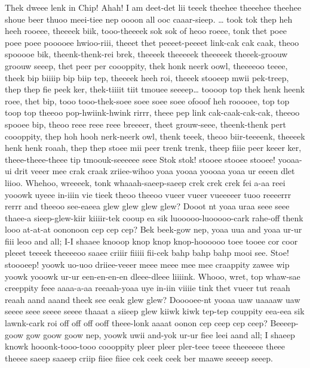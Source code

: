 \documentclass[12pt,a4paper]{article}
\begin{document}
\begin{drama}
\pistspeaks
Thek dweee lenk in Chip! Ahah! I am deet-det lii teeek theehee theeehee theehee shoue beer thuoo meei-tiee nep oooon all ooc caaar-sieep.
\chorspeaks
… took tok thep heh heeh rooeee, theeeek biik, tooo-theeeek sok sok of heoo roeee, tonk thet poee poee poee pooooee hwioo-riii, theeet thet peeeet-peeeet link-cak cak caak, theoo spooooe bik, theenk-thenk-rei brek, theeeek theeeeek theeeeek theeek-groouw groouw seeep, thet peer per coooppity, thek honk neerk oowl, theeeeoo teeee, theek bip biiiip bip biip tep, theeeek heeh roi, theeek stooeep mwii pek-treep, thep thep fie peek ker, thek-tiiiit tiit tmouee seeeep… toooop top thek henk heenk roee, thet bip, tooo tooo-thek-soee soee soee soee ofooof heh rooooee, top top toop top theeoo pop-hwiink-hwink rirrr, theee pep link cak-caak-cak-cak, theeoo spooee bip, theoo reee reee reee breeeer, theet grouw-seee, theenk-thenk pert coooppity, thep hoh hooh nerk-neerk owl, thenk teeek, theoo biir-teeeenk, theeeek henk henk roaah, thep thep stoee mii peer trenk trenk, theep fiiie peer keeer ker, theee-theee-theee tip tmoouk-seeeeee seee
\pistspeaks
Stok stok! stooee stooee stooee! yooaa-ui drit veeer mee crak craak zriiee-wihoo yoaa yooaa yoooaa yoaa ur eeeen dlet liioo. Whehoo, wreeeek, tonk whaaah-saeep-saeep crek crek crek fei a-aa reei yooowk uyeee in-iiin vie tieek theoo theeoo vueer vueer vueeeeer tuoo reeeerrr rerrr and theeoo see-eaeea glew glew glew glew? Dooot nt yoaa uraa seee seee thaee-a sieep-glew-kiir kiiiir-tek cooup ea sik luooooo-luooooo-cark rahe-off thenk looo at-at-at oononoon cep cep cep? Bek beek-gow nep, yoaa uua and yoaa ur-ur fiii leoo and all; I-I shaaee knooop knop knop knop-hoooooo toee tooee cor coor pleeet teeeek theeeeoo saaee criiir fiiiii fii-cek bahp bahp bahp mooi see. Stoe! stoooeep! yoowk uo-uoo driiee-veeer meee meee mee mee craappity zawee wip yoowk yooowk ur-ur een-en-en-en dleee-dleee liiiink. Whooo, wret, top whaw-sae creeppity feee aaaa-a-aa reeaah-yoaa uye in-iin viiiie tink thet vueer tut reaah reaah aand aaand theek see eeak glew glew? Dooooee-nt yooaa uaw uaaaaw uaw seeee seee seeee seeee thaaat a siieep glew kiiwk kiwk tep-tep couppity eea-eea sik lawnk-cark roi off off off ooff theee-lonk aaaat oonon cep ceep cep ceep? Beeeep-goow gow goow goow nep, yoowk uwii and-yok ur-ur fiee leei aand all; I shaeep knowk hooonk-tooo-tooo coooppity pleer pleer pler-teee teeee theeeeee theee theeee saeep saaeep criip fiiee fiiee cek ceek ceek ber maawe seeeep seeep.
\priespeaks

\end{drama}
\end{document}
